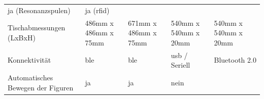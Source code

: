 \begin{longtable}[]{@{}lllll@{}}
\begin{minipage}[t]{0.15\columnwidth}
ja (Resonanzspulen)\strut
\end{minipage} & \begin{minipage}[t]{0.13\columnwidth}\raggedright
ja (\gls{rfid})\strut
\end{minipage}\tabularnewline
\begin{minipage}[t]{0.18\columnwidth}\raggedright
Tischabmessungen (LxBxH)\strut
\end{minipage} & \begin{minipage}[t]{0.18\columnwidth}\raggedright
486mm x 486mm x 75mm\strut
\end{minipage} & \begin{minipage}[t]{0.22\columnwidth}\raggedright
671mm x 486mm x 75mm\strut
\end{minipage} & \begin{minipage}[t]{0.15\columnwidth}\raggedright
540mm x 540mm x 20mm\strut
\end{minipage} & \begin{minipage}[t]{0.13\columnwidth}\raggedright
540mm x 540mm x 20mm\strut
\end{minipage}\tabularnewline
\begin{minipage}[t]{0.18\columnwidth}\raggedright
Konnektivität\strut
\end{minipage} & \begin{minipage}[t]{0.18\columnwidth}\raggedright
\gls{ble}\strut
\end{minipage} & \begin{minipage}[t]{0.22\columnwidth}\raggedright
\gls{ble}\strut
\end{minipage} & \begin{minipage}[t]{0.15\columnwidth}\raggedright
\gls{usb} / Seriell\strut
\end{minipage} & \begin{minipage}[t]{0.13\columnwidth}\raggedright
Bluetooth 2.0\strut
\end{minipage}\tabularnewline
\begin{minipage}[t]{0.18\columnwidth}\raggedright
Automatisches Bewegen der Figuren\strut
\end{minipage} & \begin{minipage}[t]{0.18\columnwidth}\raggedright
ja\strut
\end{minipage} & \begin{minipage}[t]{0.22\columnwidth}\raggedright
ja\strut
\end{minipage} & \begin{minipage}[t]{0.15\columnwidth}\raggedright
nein\strut
\end{minipage} & \begin{minipage}[t]{0.13\columnwidth}\raggedright

\end{minipage}
\end{longtable}
